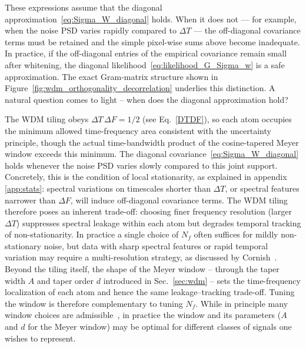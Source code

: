\documentclass[twocolumn,preprintnumbers,
  superscriptaddress,
  nofootinbib,
  amsmath,
  amssymb,
  aps,
  prd,
  colorlinks=true,
  linkcolor=blue,
  urlcolor=blue,
  citecolor=blue,
  anchorcolor=blue
]{revtex4-2}
\begin{document}
These expressions assume that the diagonal approximation~\eqref{eq:Sigma_W_diagonal} holds. When it does not --- for example, when the noise PSD varies rapidly compared to $\Delta T$ --- the off-diagonal covariance terms must be retained and the simple pixel-wise sums above become inadequate.
In practice, if the off-diagonal entries of the empirical covariance remain small after whitening, the diagonal likelihood~\eqref{eq:likelihood_G_Sigma_w} is a safe approximation. The exact Gram-matrix structure shown in Figure~\ref{fig:wdm_orthogonality_decorrelation} underlies this distinction.  A natural question comes to light -- when does the diagonal approximation hold? 

The WDM tiling obeys $\Delta T\,\Delta F = 1/2$ (see Eq.~\eqref{DTDF}), so each atom occupies the minimum allowed time-frequency area consistent with the uncertainty principle, though the actual time-bandwidth product of the cosine-tapered Meyer window exceeds this minimum. The diagonal covariance~\eqref{eq:Sigma_W_diagonal} holds whenever the noise PSD varies slowly compared to this joint support. Concretely, this is the condition of local stationarity, as explained in appendix \ref{app:stats}: spectral variations on timescales shorter than $\Delta T$, or spectral features narrower than $\Delta F$, will induce off-diagonal covariance terms.
The WDM tiling therefore poses an inherent trade-off: choosing finer frequency resolution (larger $\Delta T$) suppresses spectral leakage within each atom but degrades temporal tracking of non-stationarity. In practice a single choice of $N_f$ often suffices for mildly non-stationary noise, but data with sharp spectral features or rapid temporal variation may require a multi-resolution strategy, as discussed by Cornish~\cite{Cornish:2020odn}. Beyond the tiling itself, the shape of the Meyer window -- through the taper width $A$ and taper order $d$ introduced in Sec.~\ref{sec:wdm} -- sets the time-frequency localization of each atom and hence the same leakage--tracking trade-off. Tuning the window is therefore complementary to tuning $N_f$. While in principle many window choices are admissible~\cite{Necula_2012}, in practice the window and its parameters ($A$ and $d$ for the Meyer window) may be optimal for different classes of signals one wishes to represent.
\end{document}
